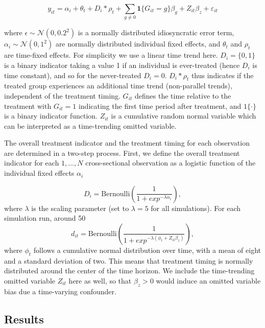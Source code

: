 \begin{equation} \label{eq:dgp1}
y_{it} = \alpha_i + \theta_t + D_i*\rho_t + \sum_{g \neq 0}\mathbf{1}\{G_{it} = g\}\beta_g + Z_{it}\beta_z + \varepsilon_{it}
\end{equation}

where $\epsilon \sim \mathcal{N}(0, 0.2^{2})$ is a normally distributed idiosyncratic error term, $\alpha_i \sim \mathcal{N}(0, 1^{2})$ are normally distributed individual fixed effects, and $\theta_t$ and $\rho_t$ are time-fixed effects. For simplicity we use a linear time trend here. $D_i = \{0, 1\}$ is a binary indicator taking a value 1 if an individual is ever-treated (hence $D_i$ is time constant), and so for the never-treated $D_i=0$. $D_i*\rho_t$ thus indicates if the treated group experiences an additional time trend (non-parallel trends), independent of the treatment timing. $G_{it}$ defines the time relative to the treatment with $G_{it} = 1$ indicating the first time period after treatment, and $1\{\cdot\}$ is a binary indicator function. $Z_{it}$ is a cumulative random normal variable which can be interpreted as a time-trending omitted variable.

The overall treatment indicator and the treatment timing for each observation are determined in a two-step process. First, we define the overall treatment indicator for each $1,\ldots,N$ cross-sectional observation as a logistic function of the individual fixed effects $\alpha_i$

\begin{equation} \label{eq:dgp2}
D_{i} = \mathrm{Bernoulli} \left( \frac{1}{1 + exp^{- \lambda \alpha_i}}\right),
\end{equation}
where $\lambda$ is the scaling parameter (set to $\lambda = 5$ for all simulations). For each simulation run, around 50\
\begin{equation} \label{eq:dgp3}
d_{it} = \mathrm{Bernoulli} \left( \frac{1}{1 + exp^{- \lambda ( \phi_t +  Z_{it}\beta_z)}} \right),
\end{equation}
where $\phi_t$ follows a cumulative normal distribution over time, with a mean of eight and a standard deviation of two. This means that treatment timing is normally distributed around the center of the time horizon. We include the time-trending omitted variable $Z_{it}$ here as well, so that $\beta_z > 0$ would induce an omitted variable bias due a time-varying confounder.

\subsection{Results}


